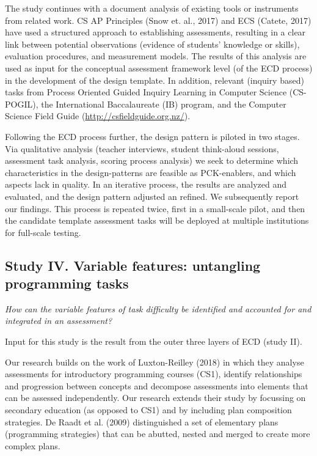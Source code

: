 
The study continues with a document analysis of existing tools or instruments from related work. CS AP Principles (Snow et. al., 2017) and ECS (Catete, 2017) have used a structured approach to establishing assessments, resulting in a clear link between potential observations (evidence of students' knowledge or skills), evaluation procedures, and measurement models. The results of this analysis are used as input for the conceptual assessment framework level (of the ECD process) in the development of the design template. In addition, relevant (inquiry based) tasks from Process Oriented Guided Inquiry Learning in Computer Science (CS-POGIL), the International Baccalaureate (IB) program, and the Computer Science Field Guide (\url{http://csfieldguide.org.nz/}).



Following the ECD process further, the design pattern is piloted in two stages. Via qualitative analysis (teacher interviews, student think-aloud sessions, assessment task analysis, scoring process analysis) we seek to determine which characteristics in the design-patterns are feasible as PCK-enablers, and which aspects lack in quality. In an iterative process, the results are analyzed and evaluated, and the design pattern adjusted an refined. We subsequently report our findings. This process is repeated twice, first in a small-scale pilot, and then the candidate template assessment tasks will be deployed at multiple institutions for full-scale testing.


\subsection{Study IV. Variable features: untangling programming tasks}
\textit{How can the variable features of task difficulty be identified and accounted for and integrated in an assessment?}

Input for this study is the result from the outer three layers of ECD (study II).

Our research builds on the work of Luxton-Reilley (2018) in which they analyse assessments for introductory programming courses (CS1), identify relationships and progression between concepts and decompose assessments into elements that can be assessed independently. Our research extends their study by focussing on secondary education (as opposed to CS1) and by including plan composition strategies. De Raadt et al. (2009) distinguished a set of elementary plans (programming strategies) that can be abutted, nested and merged to create more complex plans.


